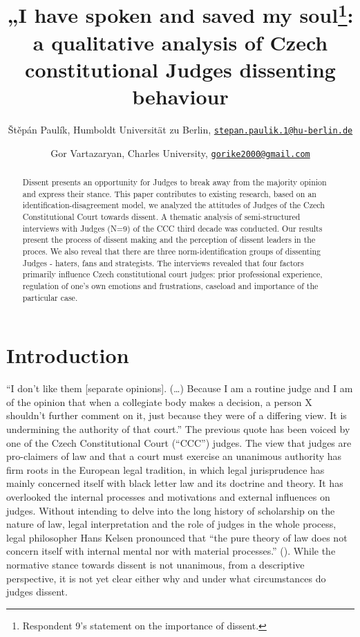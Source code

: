 \documentclass[
  11pt,
]{article}
\title{„I have spoken and saved my soul\footnote{Respondent 9's statement on the importance of dissent.}: a qualitative analysis of Czech constitutional Judges dissenting behaviour}
\author{Štěpán Paulík, Humboldt Universität zu Berlin, \href{mailto:stepan.paulik.1@hu-berlin.de}{\nolinkurl{stepan.paulik.1@hu-berlin.de}} \and Gor Vartazaryan, Charles University, \href{mailto:gorike2000@gmail.com}{\nolinkurl{gorike2000@gmail.com}}}
\date{}
\begin{document}
\maketitle
\begin{abstract}
Dissent presents an opportunity for Judges to break away from the majority opinion and express their stance. This paper contributes to existing research, based on an identification-disagreement model, we analyzed the attitudes of Judges of the Czech Constitutional Court towards dissent. A thematic analysis of semi-structured interviews with Judges (N=9) of the CCC third decade was conducted. Our results present the process of dissent making and the perception of dissent leaders in the proces. We also reveal that there are three norm-identification groups of dissenting Judges - haters, fans and strategists. The interviews revealed that four factors primarily influence Czech constitutional court judges: prior professional experience, regulation of one's own emotions and frustrations, caseload and importance of the particular case.
\end{abstract}

{
\hypersetup{linkcolor=}
\setcounter{tocdepth}{2}
\tableofcontents
}
\section{Introduction}\label{introduction}

``I don't like them {[}separate opinions{]}. (\ldots) Because I am a routine judge and I am of the opinion that when a collegiate body makes a decision, a person X shouldn't further comment on it, just because they were of a differing view. It is undermining the authority of that court.'' The previous quote has been voiced by one of the Czech Constitutional Court (``CCC'') judges. The view that judges are pro-claimers of law and that a court must exercise an unanimous authority has firm roots in the European legal tradition, in which legal jurisprudence has mainly concerned itself with black letter law and its doctrine and theory. It has overlooked the internal processes and motivations and external influences on judges. Without intending to delve into the long history of scholarship on the nature of law, legal interpretation and the role of judges in the whole process, legal philosopher Hans Kelsen pronounced that ``the pure theory of law does not concern itself with internal mental nor with material processes.'' (). While the normative stance towards dissent is not unanimous, from a descriptive perspective, it is not yet clear either why and under what circumstances do judges dissent.
\end{document}
